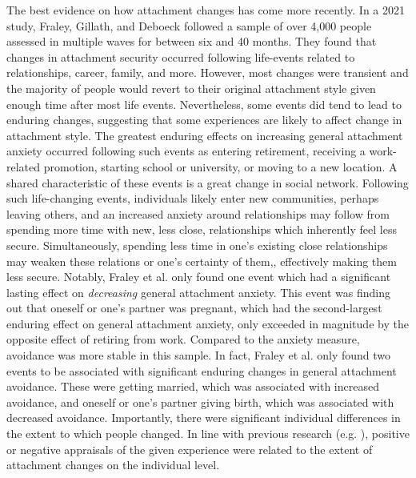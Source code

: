 \documentclass[12pt]{report}
\begin{document}
The best evidence on how attachment changes has come more recently. In a 2021 study, Fraley, Gillath, and Deboeck followed a sample of over 4,000 people assessed in multiple waves for between six and 40 months. They found that changes in attachment security occurred following life-events related to relationships, career, family, and more. However, most changes were transient and the majority of people would revert to their original attachment style given enough time after most life events.
Nevertheless, some events did tend to lead to enduring changes, suggesting that some experiences are likely to affect change in attachment style.
The greatest enduring effects on increasing general attachment anxiety occurred following such events as entering retirement, receiving a work-related promotion, starting school or university, or moving to a new location. A shared characteristic of these events is a great change in social network. Following such life-changing events, individuals likely enter new communities, perhaps leaving others, and an increased anxiety around relationships may follow from spending more time with new, less close, relationships which inherently feel less secure. Simultaneously, spending less time in one's existing close relationships may weaken these relations or one's certainty of them,, effectively making them less secure.
Notably, Fraley et al. only found one event which had a significant lasting effect on \textit{decreasing} general attachment anxiety. This event was finding out that oneself or one's partner was pregnant, which had the second-largest enduring effect on general attachment anxiety, only exceeded in magnitude by the opposite effect of retiring from work.
Compared to the anxiety measure, avoidance was more stable in this sample. In fact, Fraley et al. only found two events to be associated with significant enduring changes in general attachment avoidance. These were getting married, which was associated with increased avoidance, and oneself or one's partner giving birth, which was associated with decreased avoidance.
Importantly, there were significant individual differences in the extent to which people changed. In line with previous research (e.g. \cite{Zhang2004}), positive or negative appraisals of the given experience were related to the extent of attachment changes on the individual level.
\end{document}
